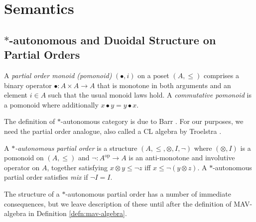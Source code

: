 \section{Semantics}\label{sec:mav-semantics}

\newcommand{\LowerSet}[1]{\widehat{#1}}
\newcommand{\Day}[1]{\mathop{\widehat{#1}}}
\newcommand{\ClosedLowerSet}[1]{\widehat{#1}^+}
\newcommand{\ClosedDay}[1]{\mathop{\widehat{#1}^+}}
\newcommand{\Chu}{\mathrm{Chu}}
\newcommand{\op}{\mathrm{op}}


\subsection{$*$-autonomous and Duoidal Structure on Partial Orders}

\begin{definition}
  A \emph{partial order monoid (pomonoid)} $(\bullet, i)$ on a poset
  $(A, \leq)$ comprises a binary operator $\bullet : A \times A \to A$
  that is monotone in both arguments and an element $i \in A$ such
  that the usual monoid laws hold. A \emph{commutative pomonoid} is a
  pomonoid where additionally $x \bullet y = y \bullet x$.
\end{definition}

\begin{definition}
\end{definition}

The definition of $*$-autonomous category is due to Barr
\cite{Barr_1979}. For our purposes, we need the partial order
analogue, also called a CL algebra by Troelstra
\cite{Troelstra92:lll}.

\begin{definition}
  A \emph{$*$-autonomous partial order} is a structure
  $(A, \leq, \otimes, I, \lnot)$ where $(\otimes, I)$ is a pomonoid on
  $(A, \leq)$ and $\lnot : A^\op \to A$ is an anti-monotone and
  involutive operator on $A$, together satisfying
  $x \otimes y \leq \lnot z$ iff $x \leq \lnot (y \otimes z)$.  A
  $*$-autonomous partial order satisfies \emph{mix} if $\lnot I = I$.
\end{definition}

\begin{remark}
  The structure of a $*$-autonomous partial order has a number of
  immediate consequences, but we leave description of these until
  after the definition of MAV-algebra in Definition
  \ref{defn:mav-algebra}.
\end{remark}

